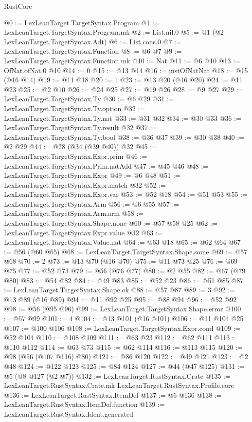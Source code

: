 \begin{lexlean}{RustCore}
\begin{coremodule}
{\begin{coremodule}
{{{{{@0 := LexLeanTarget.TargetSyntax.Program
@1 := LexLeanTarget.TargetSyntax.Program.mk
@2 := List.nil.{0}
@5 := @1 (@2 LexLeanTarget.TargetSyntax.Adt)
@6 := List.cons.{0}
@7 := LexLeanTarget.TargetSyntax.Function
@8 := @6 @7
@9 := LexLeanTarget.TargetSyntax.Function.mk
@10 := Nat
@11 := @6 @10
@13 := OfNat.ofNat.{0} @10
@14 := 0
@15 := @13 @14
@16 := instOfNatNat
@18 := @15 (@16 @14)
@19 := @11 @18
@20 := 1
@23 := @13 @20 (@16 @20)
@24 := @11 @23
@25 := @2 @10
@26 := @24 @25
@27 := @19 @26
@28 := @9 @27
@29 := LexLeanTarget.TargetSyntax.Ty
@30 := @6 @29
@31 := LexLeanTarget.TargetSyntax.Ty.option
@32 := LexLeanTarget.TargetSyntax.Ty.nat
@33 := @31 @32
@34 := @30 @33
@36 := LexLeanTarget.TargetSyntax.Ty.result @32
@37 := LexLeanTarget.TargetSyntax.Ty.bool
@38 := @36 @37
@39 := @30 @38
@40 := @2 @29
@44 := @28 (@34 (@39 @40)) @32
@45 := LexLeanTarget.TargetSyntax.Expr.prim
@46 := LexLeanTarget.TargetSyntax.Prim.natAdd
@47 := @45 @46
@48 := LexLeanTarget.TargetSyntax.Expr
@49 := @6 @48
@51 := LexLeanTarget.TargetSyntax.Expr.match @32
@52 := LexLeanTarget.TargetSyntax.Expr.var
@53 := @52 @18
@54 := @51 @53
@55 := LexLeanTarget.TargetSyntax.Arm
@56 := @6 @55
@57 := LexLeanTarget.TargetSyntax.Arm.arm
@58 := LexLeanTarget.TargetSyntax.Shape.none
@60 := @57 @58 @25
@62 := LexLeanTarget.TargetSyntax.Expr.value @32
@63 := LexLeanTarget.TargetSyntax.Value.nat
@64 := @63 @18
@65 := @62 @64
@67 := @56 (@60 @65)
@68 := LexLeanTarget.TargetSyntax.Shape.some
@69 := @57 @68
@70 := 2
@73 := @13 @70 (@16 @70)
@75 := @11 @73 @25
@76 := @69 @75
@77 := @52 @73
@79 := @56 (@76 @77)
@80 := @2 @55
@82 := @67 (@79 @80)
@83 := @54 @82
@84 := @49 @83
@85 := @52 @23
@86 := @51 @85
@87 := LexLeanTarget.TargetSyntax.Shape.ok
@88 := @57 @87
@89 := 3
@92 := @13 @89 (@16 @89)
@94 := @11 @92 @25
@95 := @88 @94
@96 := @52 @92
@98 := @56 (@95 @96)
@99 := LexLeanTarget.TargetSyntax.Shape.error
@100 := @57 @99
@101 := 4
@104 := @13 @101 (@16 @101)
@106 := @11 @104 @25
@107 := @100 @106
@108 := LexLeanTarget.TargetSyntax.Expr.cond
@109 := @52 @104
@110 := @108 @109
@111 := @63 @23
@112 := @62 @111
@113 := @110 @112
@114 := @63 @73
@115 := @62 @114
@116 := @113 @115
@120 := @98 (@56 (@107 @116) @80)
@121 := @86 @120
@122 := @49 @121
@123 := @2 @48
@124 := @122 @123
@125 := @84 @124
@127 := @44 (@47 @125)
@131 := @5 (@8 @127 (@2 @7))
@132 := LexLeanTarget.RustSyntax.Crate
@135 := LexLeanTarget.RustSyntax.Crate.mk LexLeanTarget.RustSyntax.Profile.core
@136 := LexLeanTarget.RustSyntax.ItemDef
@137 := @6 @136
@138 := LexLeanTarget.RustSyntax.ItemDef.function
@139 := LexLeanTarget.RustSyntax.Ident.generated
}}}}}
\end{coremodule}}
\end{coremodule}
\end{lexlean}
